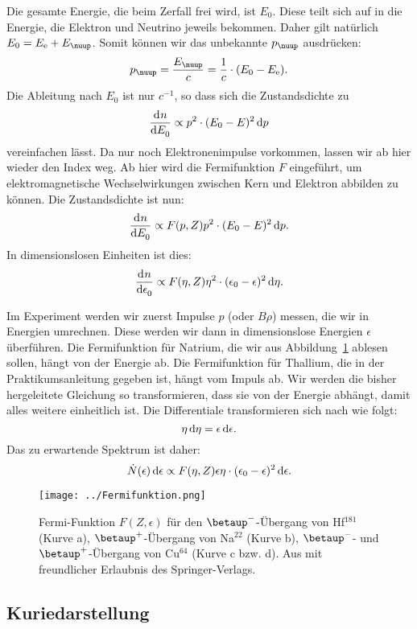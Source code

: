 Die gesamte Energie, die beim Zerfall frei wird, ist $E_0$. Diese teilt sich
auf in die Energie, die Elektron und Neutrino jeweils bekommen. Daher gilt
natürlich $E_0 = E_{\text e} + E_\nuup$. Somit können wir das unbekannte
$p_\nuup$ ausdrücken:
\[
    p_\nuup = \frac{E_\nuup}{c} = \frac 1c \cdot (E_0 - E_{\text e}).
\]
Die Ableitung nach $E_0$ ist nur $c^{-1}$, so dass sich die Zustandsdichte zu
\[
    \dod n{E_0} \propto p^2 \cdot (E_0 - E)^2 \dif p
\]
vereinfachen lässt. Da nur noch Elektronenimpulse vorkommen, lassen wir ab hier
wieder den Index weg. Ab hier wird die Fermifunktion $F$ eingeführt, um
elektromagnetische Wechselwirkungen zwischen Kern und Elektron abbilden zu
können. Die Zustandsdichte ist nun:
\[
    \dod n{E_0} \propto F(p, Z) p^2 \cdot (E_0 - E)^2 \dif p.
\]
In dimensionslosen Einheiten ist dies:
\[
    \dod n{\epsilon_0} \propto F(\eta, Z) \eta^2 \cdot (\epsilon_0 -
    \epsilon)^2 \dif \eta.
\]

Im Experiment werden wir zuerst Impulse $p$ (oder $B\rho$) messen, die wir in
Energien umrechnen. Diese werden wir dann in dimensionslose Energien $\epsilon$
überführen. Die Fermifunktion für Natrium, die wir aus
Abbildung~\ref{fig:fermifunktion} ablesen sollen, hängt von der Energie ab. Die
Fermifunktion für Thallium, die in der Praktikumsanleitung gegeben ist, hängt
vom Impuls ab. Wir werden die bisher hergeleitete Gleichung so transformieren,
dass sie von der Energie abhängt, damit alles weitere einheitlich ist. Die
Differentiale transformieren sich nach
\parencite[(135)]{Riezler/Kernphysikalisches} wie folgt:
\[
    \eta \dif \eta = \epsilon \dif \epsilon.
\]
Das zu erwartende Spektrum ist daher:
\[
    \dot N(\epsilon) \dif \epsilon \propto F(\eta, Z) \epsilon\eta \cdot (\epsilon_0 -
    \epsilon)^2 \dif \epsilon.
\]

\begin{figure}[htbp]
    \centering
    \texttt{[image: ../Fermifunktion.png]}
    \caption{%
        Fermi-Funktion $F(Z, \epsilon)$ für den $\betaminus$-Übergang von
        Hf$^{181}$ (Kurve a), $\betaplus$-Übergang von Na$^{22}$ (Kurve b),
        $\betaminus$- und $\betaplus$-Übergang von Cu$^{64}$ (Kurve c bzw\@.
        d). Aus \parencite[Fig. 111]{Riezler/Kernphysikalisches} mit
        freundlicher Erlaubnis des Springer-Verlags.
    }
    \label{fig:fermifunktion}
\end{figure}

\subsection{Kuriedarstellung}

